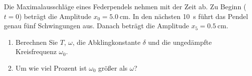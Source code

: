 \begin{ExerciseBlock}
Die Maximalausschläge eines Federpendels nehmen mit der Zeit ab. Zu Beginn ($t=0$) beträgt die Amplitude $x_0=\qty{5.0}{\centi\metre}$. In den nächsten \qty{10}{\second} führt das Pendel genau fünf Schwingungen aus. Danach beträgt die Amplitude $x_5=\qty{0.5}{\centi\metre}$.
\begin{enumerate}
\item Berechnen Sie $T$, $\omega$, die Abklingkonstante $\delta$ und die ungedämpfte Kreisfrequenz $\omega_0$.
\item Um wie viel Prozent ist $\omega_0$ größer als $\omega$?
\end{enumerate}
\end{ExerciseBlock}
